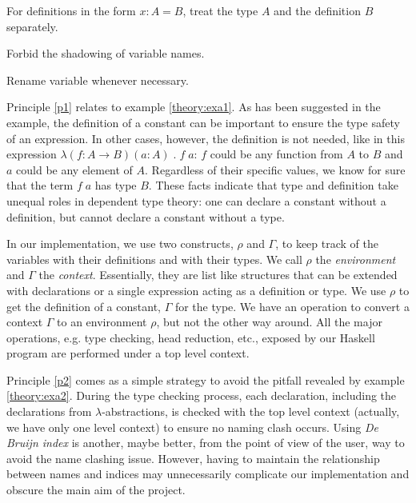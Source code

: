 \begin{principle} \label{p1}
  For definitions in the form $x : A = B$, treat the type $A$ and the definition $B$ separately.
\end{principle}

\begin{principle} \label{p2}
  Forbid the shadowing of variable names.
\end{principle}

\begin{principle} \label{p3}
  Rename variable whenever necessary. 
\end{principle}

Principle \ref{p1} relates to example \ref{theory:exa1}. As has been suggested in the example, the definition of a constant can be important to ensure the type safety of an expression. In other cases, however, the definition is not needed, like in this expression $\lambda (f : A \to B) (a : A) \; . \; f \; a$: $f$ could be any function from $A$ to $B$ and $a$ could be any element of $A$. Regardless of their specific values, we know for sure that the term $f \; a$ has type $B$. These facts indicate that type and definition take unequal roles in dependent type theory: one can declare a constant without a definition, but cannot declare a constant without a type.

In our implementation, we use two constructs, $\rho$ and $\Gamma$, to keep track of the variables with their definitions and with their types. We call $\rho$ the \emph{environment} and $\Gamma$ the \emph{context}. Essentially, they are list like structures that can be extended with declarations or a single expression acting as a definition or type. We use $\rho$ to get the definition of a constant, $\Gamma$ for the type. We have an operation to convert a context $\Gamma$ to an environment $\rho$, but not the other way around. All the major operations, e.g. type checking, head reduction, etc., exposed by our Haskell program are performed under a top level context.

Principle \ref{p2} comes as a simple strategy to avoid the pitfall revealed by example \ref{theory:exa2}. During the type checking process, each declaration, including the declarations from $\lambda$-abstractions, is checked with the top level context (actually, we have only one level context) to ensure no naming clash occurs. Using \emph{De Bruijn index} is another, maybe better, from the point of view of the user, way to avoid the name clashing issue. However, having to maintain the relationship between names and indices may unnecessarily complicate our implementation and obscure the main aim of the project. 


